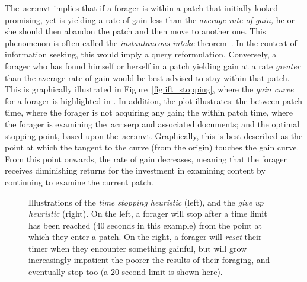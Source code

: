 The~\gls{acr:mvt} implies that if a forager is within a patch that initially looked promising, yet is yielding a rate of gain less than the \emph{average rate of gain,} he or she should then abandon the patch and then move to another one. This phenomenon is often called the \emph{instantaneous intake} theorem~\citep{stephens1986foraging_theory}. In the context of information seeking, this would imply a query reformulation. Conversely, a forager who has found himself or herself in a patch yielding gain at a rate \emph{greater} than the average rate of gain would be best advised to stay within that patch. This is graphically illustrated in Figure~\ref{fig:ift_stopping}, where the \emph{gain curve} for a forager is highlighted in . In addition, the plot illustrates:  the between patch time, where the forager is not acquiring any gain;  the within patch time, where the forager is examining the~\gls{acr:serp} and associated documents; and  the optimal stopping point, based upon the~\gls{acr:mvt}. Graphically, this is best described as the point at which the tangent to the curve (from the origin) touches the gain curve. From this point onwards, the rate of gain decreases, meaning that the forager receives diminishing returns for the investment in examining content by continuing to examine the current patch.

\begin{figure}[t!]
    \centering
    \caption[Time-based stopping heuristics]{Illustrations of the \emph{time stopping heuristic} (left), and the \emph{give up heuristic} (right). On the left, a forager will stop after a time limit has been reached (40 seconds in this example) from the point at which they enter a patch. On the right, a forager will \emph{reset} their timer when they encounter something gainful, but will grow increasingly impatient the poorer the results of their foraging, and eventually stop too (a 20 second limit is shown here).}
    \label{fig:gut}
\end{figure}

